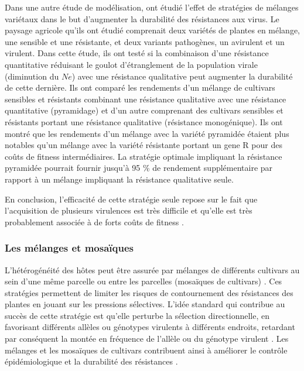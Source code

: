 	Dans une autre étude de modélisation, \citet{Rousseau2019} ont étudié l’effet de stratégies de mélanges variétaux dans le but d’augmenter la durabilité des résistances aux virus. Le paysage agricole qu’ils ont étudié comprenait  deux variétés de plantes en mélange, une sensible et une résistante, et deux variants pathogènes, un avirulent et un virulent. 
Dans cette étude, ils ont testé  si la combinaison d'une résistance quantitative réduisant le goulot d'étranglement de la population virale (diminution du $Ne$) avec une résistance qualitative peut augmenter la durabilité de cette dernière. 
Ils ont comparé  les rendements d'un mélange de cultivars sensibles et résistants combinant une résistance qualitative avec une résistance quantitative (pyramidage) et d'un autre comprenant des cultivars sensibles et résistants portant une résistance qualitative (résistance monogénique).
Ils ont montré que les rendements d'un mélange avec la variété pyramidée étaient plus notables  qu'un mélange avec la variété résistante portant un \gls{gene R} pour des coûts de fitness intermédiaires. La stratégie optimale impliquant la résistance pyramidée pourrait fournir jusqu'à 95 \%  de rendement supplémentaire par rapport à un mélange impliquant la résistance qualitative seule.%

	En conclusion, l'efficacité de cette stratégie seule repose sur le fait que l'acquisition de plusieurs virulences  est très difficile et qu'elle est très probablement associée à de forts coûts de fitness \citep{Brown2015, Leach2001, Fabre2009, Janzac2009}. 


\subsubsection{Les mélanges et mosaïques}
\label{subsubsec:mel}

	L'hétérogénéité des hôtes peut être assurée par  mélanges de différents cultivars  au sein d'une même parcelle  ou entre les parcelles (mosaïques de cultivars) \citep{Keesing2006, Mccallum2015}. Ces stratégies  permettent  de limiter les risques de contournement des résistances des plantes en jouant sur les pressions sélectives. L'idée standard qui contribue au  succès de cette stratégie est qu'elle perturbe la sélection directionnelle, en favorisant différents allèles ou génotypes virulents à différents endroits, retardant par conséquent la montée en fréquence de l'allèle ou du génotype virulent \citep{McDonald2002}. 
Les mélanges et les mosaïques de cultivars contribuent ainsi à améliorer le contrôle épidémiologique et la durabilité des résistances \citep{Burdon2016, Burdon2014}.
	
